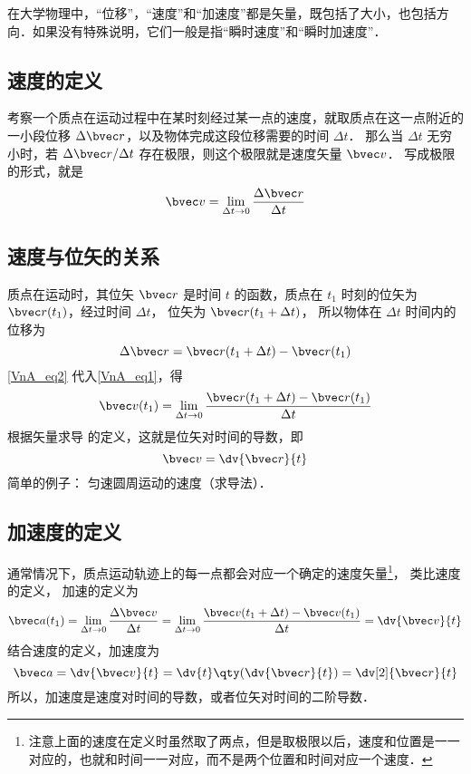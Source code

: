 

在大学物理中，“位移”，“速度”和“加速度”都是矢量，既包括了大小，也包括方向．如果没有特殊说明，它们一般是指“瞬时速度”和“瞬时加速度”．

\subsection{速度的定义}
考察一个质点在运动过程中在某时刻经过某一点的速度，就取质点在这一点附近的一小段位移 $\Delta\bvec r$，以及物体完成这段位移需要的时间 $\Delta t$． 那么当 $\Delta t$ 无穷小时，若 $\Delta \bvec r/\Delta t$ 存在极限，则这个极限就是速度矢量 $\bvec v$． 写成极限的形式，就是
\begin{equation}\label{VnA_eq1}
\bvec v = \lim_{\Delta t \to 0} \frac{\Delta \bvec r}{\Delta t}
\end{equation}

\subsection{速度与位矢的关系}

质点在运动时，其位矢 $\bvec r$ 是时间 $t$ 的函数，质点在 $t_1$ 时刻的位矢为 $\bvec r(t_1)$，经过时间 $\Delta t$， 位矢为 $\bvec r(t_1 + \Delta t)$， 所以物体在 $\Delta t$ 时间内的位移为
\begin{equation}\label{VnA_eq2}
\Delta \bvec r = \bvec r (t_1 + \Delta t) - \bvec r (t_1)
\end{equation}
\autoref{VnA_eq2} 代入\autoref{VnA_eq1}，得
\begin{equation}\label{VnA_eq3}
\bvec v(t_1) = \lim_{\Delta t \to 0} \frac{\bvec r (t_1 + \Delta t) - \bvec r(t_1)}{\Delta t}
\end{equation}
根据矢量求导 的定义，这就是位矢对时间的导数，即
\begin{equation}
\bvec v = \dv{\bvec r}{t}
\end{equation}
简单的例子： 匀速圆周运动的速度（求导法）．

\subsection{加速度的定义}

通常情况下，质点运动轨迹上的每一点都会对应一个确定的速度矢量\footnote{注意上面的速度在定义时虽然取了两点，但是取极限以后，速度和位置是一一对应的，也就和时间一一对应，而不是两个位置和时间对应一个速度．}， 类比速度的定义， 加速的定义为
\begin{equation}\label{VnA_eq4}
\bvec a(t_1) = \lim_{\Delta t \to 0} \frac{\Delta \bvec v}{\Delta t}
= \lim_{\Delta t \to 0} \frac{\bvec v(t_1 + \Delta t) - \bvec v (t_1)}{\Delta t} = \dv{\bvec v}{t}
\end{equation}
结合速度的定义，加速度为
\begin{equation}
\bvec a = \dv{\bvec v}{t} = \dv{t} \qty( \dv{\bvec r}{t} ) = \dv[2]{\bvec r}{t}
\end{equation}
所以，加速度是速度对时间的导数，或者位矢对时间的二阶导数．

